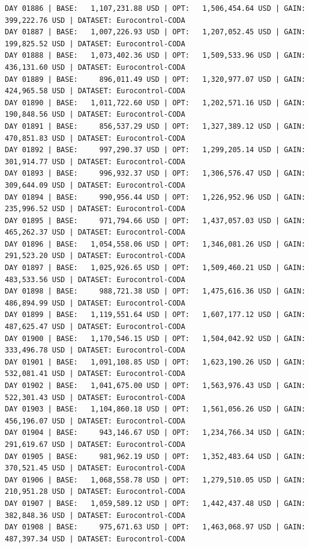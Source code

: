 \documentclass[11pt,a4paper]{article}
\begin{document}
\begin{verbatim}
DAY 01886 | BASE:   1,107,231.88 USD | OPT:   1,506,454.64 USD | GAIN: 399,222.76 USD | DATASET: Eurocontrol-CODA
DAY 01887 | BASE:   1,007,226.93 USD | OPT:   1,207,052.45 USD | GAIN: 199,825.52 USD | DATASET: Eurocontrol-CODA
DAY 01888 | BASE:   1,073,402.36 USD | OPT:   1,509,533.96 USD | GAIN: 436,131.60 USD | DATASET: Eurocontrol-CODA
DAY 01889 | BASE:     896,011.49 USD | OPT:   1,320,977.07 USD | GAIN: 424,965.58 USD | DATASET: Eurocontrol-CODA
DAY 01890 | BASE:   1,011,722.60 USD | OPT:   1,202,571.16 USD | GAIN: 190,848.56 USD | DATASET: Eurocontrol-CODA
DAY 01891 | BASE:     856,537.29 USD | OPT:   1,327,389.12 USD | GAIN: 470,851.83 USD | DATASET: Eurocontrol-CODA
DAY 01892 | BASE:     997,290.37 USD | OPT:   1,299,205.14 USD | GAIN: 301,914.77 USD | DATASET: Eurocontrol-CODA
DAY 01893 | BASE:     996,932.37 USD | OPT:   1,306,576.47 USD | GAIN: 309,644.09 USD | DATASET: Eurocontrol-CODA
DAY 01894 | BASE:     990,956.44 USD | OPT:   1,226,952.96 USD | GAIN: 235,996.52 USD | DATASET: Eurocontrol-CODA
DAY 01895 | BASE:     971,794.66 USD | OPT:   1,437,057.03 USD | GAIN: 465,262.37 USD | DATASET: Eurocontrol-CODA
DAY 01896 | BASE:   1,054,558.06 USD | OPT:   1,346,081.26 USD | GAIN: 291,523.20 USD | DATASET: Eurocontrol-CODA
DAY 01897 | BASE:   1,025,926.65 USD | OPT:   1,509,460.21 USD | GAIN: 483,533.56 USD | DATASET: Eurocontrol-CODA
DAY 01898 | BASE:     988,721.38 USD | OPT:   1,475,616.36 USD | GAIN: 486,894.99 USD | DATASET: Eurocontrol-CODA
DAY 01899 | BASE:   1,119,551.64 USD | OPT:   1,607,177.12 USD | GAIN: 487,625.47 USD | DATASET: Eurocontrol-CODA
DAY 01900 | BASE:   1,170,546.15 USD | OPT:   1,504,042.92 USD | GAIN: 333,496.78 USD | DATASET: Eurocontrol-CODA
DAY 01901 | BASE:   1,091,108.85 USD | OPT:   1,623,190.26 USD | GAIN: 532,081.41 USD | DATASET: Eurocontrol-CODA
DAY 01902 | BASE:   1,041,675.00 USD | OPT:   1,563,976.43 USD | GAIN: 522,301.43 USD | DATASET: Eurocontrol-CODA
DAY 01903 | BASE:   1,104,860.18 USD | OPT:   1,561,056.26 USD | GAIN: 456,196.07 USD | DATASET: Eurocontrol-CODA
DAY 01904 | BASE:     943,146.67 USD | OPT:   1,234,766.34 USD | GAIN: 291,619.67 USD | DATASET: Eurocontrol-CODA
DAY 01905 | BASE:     981,962.19 USD | OPT:   1,352,483.64 USD | GAIN: 370,521.45 USD | DATASET: Eurocontrol-CODA
DAY 01906 | BASE:   1,068,558.78 USD | OPT:   1,279,510.05 USD | GAIN: 210,951.28 USD | DATASET: Eurocontrol-CODA
DAY 01907 | BASE:   1,059,589.12 USD | OPT:   1,442,437.48 USD | GAIN: 382,848.36 USD | DATASET: Eurocontrol-CODA
DAY 01908 | BASE:     975,671.63 USD | OPT:   1,463,068.97 USD | GAIN: 487,397.34 USD | DATASET: Eurocontrol-CODA

\end{verbatim}
\end{document}
